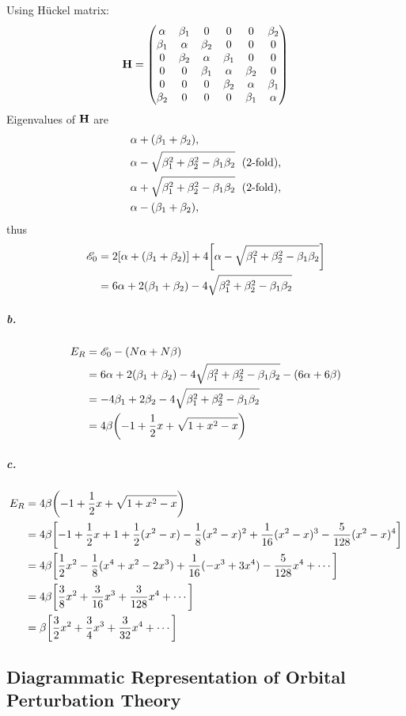 \documentclass[a4paper]{article}
\newcommand{\subex}[1]{\subparagraph{#1}}
\numberwithin{equation}{subsection}
\begin{document}
Using H\"uckel matrix:
\begin{align}
\vb{H} = \mqty( 
\alpha  & \beta_1 & 0       & 0       & 0       & \beta_2\\
\beta_1 & \alpha  & \beta_2 & 0       & 0       & 0      \\
0       & \beta_2 & \alpha  & \beta_1 & 0       & 0      \\
0       & 0       & \beta_1 & \alpha  & \beta_2 & 0      \\
0       & 0       & 0       & \beta_2 & \alpha  & \beta_1\\
\beta_2 & 0       & 0       & 0       & \beta_1 & \alpha  
)
\end{align}
Eigenvalues of $ \vb{H} $ are
\begin{align}\label{key}
&\alpha + (\beta_1 + \beta_2), \notag\\
&\alpha - \sqrt{\beta_1^2 + \beta_2^2 - \beta_1\beta_2} \;\text{ (2-fold)}, \notag\\
&\alpha + \sqrt{\beta_1^2 + \beta_2^2 - \beta_1\beta_2} \;\text{ (2-fold)}, \notag\\
&\alpha - (\beta_1 + \beta_2),
\end{align}
thus
\begin{align}
\mathscr{E}_0 &= 2\qty[\alpha + (\beta_1 + \beta_2)] + 4\qty[\alpha - \sqrt{\beta_1^2 + \beta_2^2 - \beta_1\beta_2}] \notag\\
&= 6\alpha + 2(\beta_1 + \beta_2) - 4\sqrt{\beta_1^2 + \beta_2^2 - \beta_1\beta_2}
\end{align}

\subex{b.}
\begin{align}
E_R &= \mathscr{E}_0 - (N\alpha + N\beta) \notag\\
&= 6\alpha + 2(\beta_1 + \beta_2) - 4\sqrt{\beta_1^2 + \beta_2^2 - \beta_1\beta_2} - (6\alpha + 6\beta) \notag\\
&= -4\beta_1 + 2\beta_2 - 4\sqrt{\beta_1^2 + \beta_2^2 - \beta_1\beta_2} \notag\\
&= 4\beta\qty(-1 + \dfrac{1}{2}x + \sqrt{1 + x^2 - x})
\end{align}

\subex{c.}
\begin{align}
E_R &= 4\beta\qty(-1 + \dfrac{1}{2}x + \sqrt{1 + x^2 - x}) \notag\\
&= 4\beta\qty[ -1 + \dfrac{1}{2}x 
+ 1 + \dfrac{1}{2}(x^2-x) - \dfrac{1}{8}(x^2-x)^2 + \dfrac{1}{16}(x^2-x)^3 - \dfrac{5}{128}(x^2-x)^4 ] \notag\\
&= 4\beta\qty[ 
\dfrac{1}{2}x^2 - \dfrac{1}{8}(x^4 + x^2 - 2x^3) 
+ \dfrac{1}{16}(-x^3 + 3x^4) - \dfrac{5}{128}x^4 + \cdots ] \notag\\
&= 4\beta\qty[ 
\dfrac{3}{8}x^2 + \dfrac{3}{16}x^3 + \dfrac{3}{128}x^4 + \cdots ] \notag\\
&= \beta\qty[ 
\dfrac{3}{2}x^2 + \dfrac{3}{4}x^3 + \dfrac{3}{32}x^4 + \cdots ]
\end{align}

\subsection{Diagrammatic Representation of Orbital Perturbation Theory}
\end{document}
